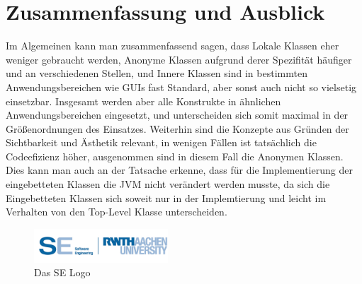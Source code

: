 \chapter{Zusammenfassung und Ausblick}

Im Algemeinen kann man zusammenfassend sagen, dass Lokale Klassen eher weniger gebraucht werden, Anonyme Klassen aufgrund derer Spezifität häufiger und an verschiedenen Stellen, und Innere Klassen sind in bestimmten Anwendungsbereichen wie GUIs fast Standard, aber sonst auch nicht so vielsetig einsetzbar.
Insgesamt werden aber alle Konstrukte in ähnlichen Anwendungsbereichen eingesetzt, und unterscheiden sich somit maximal in der Größenordnungen des Einsatzes.
Weiterhin sind die Konzepte aus Gründen der Sichtbarkeit und Ästhetik relevant, in wenigen Fällen ist tatsächlich die Codeefizienz höher, ausgenommen sind in diesem Fall die Anonymen Klassen.
Dies kann man auch an der Tatsache erkenne, dass für die Implementierung der eingebetteten Klassen die JVM nicht verändert werden musste, da sich die Eingebetteten Klassen sich soweit nur in der Implemtierung und leicht im Verhalten von den Top-Level Klasse unterscheiden.

\begin{figure}[ht!]
\begin{center}\includegraphics[width=5cm]{src/pic/logo}\end{center}
\caption{Das SE Logo}
\label{Logo}
\end{figure}

\newpage
